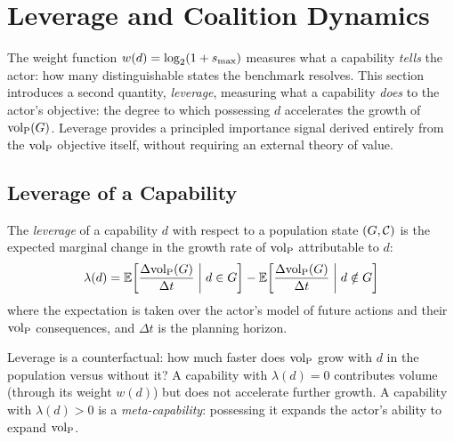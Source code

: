 \section{Leverage and Coalition Dynamics}
\label{sec:leverage}

The weight function $w(d) = \log_2(1 + s_{\mathrm{max}})$ measures what a capability
\emph{tells} the actor: how many distinguishable states the benchmark
resolves. This section introduces a second quantity, \emph{leverage}, measuring
what a capability \emph{does} to the actor's objective: the degree to which
possessing $d$ accelerates the growth of ${\operatorname{vol}_{\mathrm{P}}}(G)$. Leverage provides a
principled importance signal derived entirely from the ${\operatorname{vol}_{\mathrm{P}}}$ objective itself,
without requiring an external theory of value.

\subsection{Leverage of a Capability}
\label{sec:leverage_def}

\begin{definition}[Leverage]
\label{def:leverage}
The \emph{leverage} of a capability $d$ with respect to a population state
    $(G, \mathcal{C})$ is the expected marginal change in the growth rate of ${\operatorname{vol}_{\mathrm{P}}}$
    attributable to $d$:
\begin{equation}
\label{eq:leverage}
\lambda(d) = \mathbb{E}\!\left[\frac{\Delta {\operatorname{vol}_{\mathrm{P}}}(G)}{{\Delta t}} \;\bigg|\; d \in G\right]
  - \mathbb{E}\!\left[\frac{\Delta {\operatorname{vol}_{\mathrm{P}}}(G)}{\Delta t} \;\bigg|\; d \notin G\right]
\end{equation}
where the expectation is taken over the actor's model of future actions and
    their ${\operatorname{vol}_{\mathrm{P}}}$ consequences, and $\Delta t$ is the planning horizon.
\end{definition}

Leverage is a counterfactual: how much faster does ${\operatorname{vol}_{\mathrm{P}}}$ grow with $d$ in
the population versus without it? A capability with $\lambda(d) = 0$
contributes volume (through its weight $w(d)$) but does not accelerate
further growth. A capability with $\lambda(d) > 0$ is a \emph{meta-capability}:
possessing it expands the actor's ability to expand ${\operatorname{vol}_{\mathrm{P}}}$.

